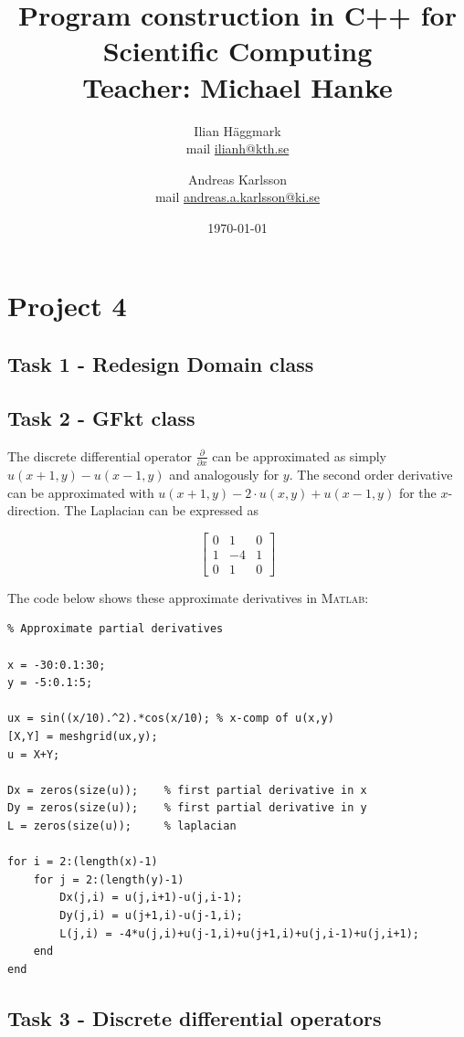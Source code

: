 \documentclass[paper=a4, fontsize=12pt]{article} %
\title{Program construction in C++ for Scientific Computing \\ Teacher: Michael Hanke}
\author{Ilian H{\"a}ggmark \\ mail \href{mailto:ilianh@kth.se}{ilianh@kth.se}
  \and Andreas Karlsson \\ mail \href{mailto:andreas.a.karlsson@ki.se}{andreas.a.karlsson@ki.se} }
\date{\normalsize\today} %
\begin{document}
\maketitle %

\section*{Project 4}
\subsection*{Task 1 - Redesign Domain class}


\subsection*{Task 2 - GFkt class}

The discrete differential operator $\frac{\partial}{\partial x}$  can be approximated as simply $u(x+1,y)-u(x-1,y)$ and analogously for $y$. The second order derivative can be approximated with $u(x+1,y)-2 \cdot u(x,y) + u(x-1,y)$ for the $x$-direction. The Laplacian can be expressed as 

$$ 
 \begin{bmatrix}
  0 & 1 &  0 \\
  1 & -4 &  1 \\
  0 & 1 &  0
 \end{bmatrix}
 $$
 
 The code below shows these approximate derivatives in \textsc{Matlab}:

\begin{lstlisting}
% Approximate partial derivatives

x = -30:0.1:30;
y = -5:0.1:5;

ux = sin((x/10).^2).*cos(x/10); % x-comp of u(x,y)
[X,Y] = meshgrid(ux,y);
u = X+Y;

Dx = zeros(size(u));    % first partial derivative in x
Dy = zeros(size(u));    % first partial derivative in y
L = zeros(size(u));     % laplacian

for i = 2:(length(x)-1)
    for j = 2:(length(y)-1)
        Dx(j,i) = u(j,i+1)-u(j,i-1);
        Dy(j,i) = u(j+1,i)-u(j-1,i);
        L(j,i) = -4*u(j,i)+u(j-1,i)+u(j+1,i)+u(j,i-1)+u(j,i+1);
    end
end
\end{lstlisting}

\subsection*{Task 3 - Discrete differential operators}
\end{document}
